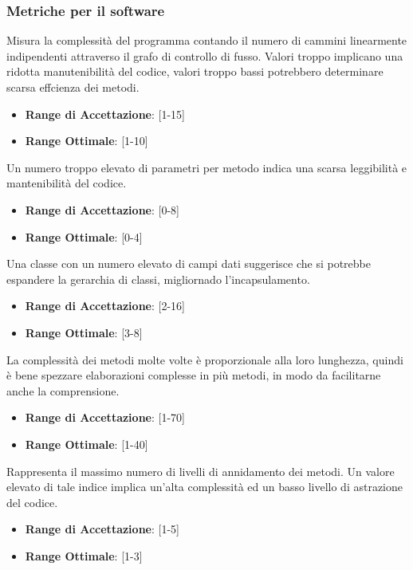 \documentclass[12pt,a4paper]{article}
\begin{document}
\subsubsection{ Metriche per il software}
Misura la complessità del programma contando il numero di cammini linearmente indipendenti attraverso il grafo di controllo di fusso. Valori troppo implicano una ridotta manutenibilità del codice, valori troppo bassi potrebbero determinare scarsa effcienza dei metodi.
\begin{itemize}
\item \textbf{Range di Accettazione}: [1-15]
\item \textbf{Range Ottimale}: [1-10]
\end{itemize}
Un numero troppo elevato di parametri per metodo indica una scarsa leggibilità e mantenibilità del codice.
\begin{itemize}
\item \textbf{Range di Accettazione}: [0-8]
\item \textbf{Range Ottimale}: [0-4]
\end{itemize}
Una classe con un numero elevato di campi dati suggerisce che si potrebbe espandere la gerarchia di classi, migliornado l'incapsulamento.
\begin{itemize}
\item \textbf{Range di Accettazione}: [2-16]
\item \textbf{Range Ottimale}: [3-8]
\end{itemize}
La complessità dei metodi molte volte è proporzionale alla loro lunghezza,
quindi è bene spezzare elaborazioni complesse in più metodi, in modo da facilitarne anche la comprensione.
\begin{itemize}
\item \textbf{Range di Accettazione}: [1-70]
\item \textbf{Range Ottimale}: [1-40]
\end{itemize}
Rappresenta il massimo numero di livelli di annidamento dei metodi. Un valore elevato di tale indice implica un’alta complessità ed un basso livello di astrazione del codice.
\begin{itemize}
\item \textbf{Range di Accettazione}: [1-5]
\item \textbf{Range Ottimale}: [1-3]
\end{itemize}
\end{document}
